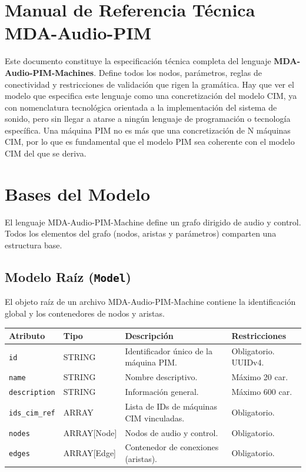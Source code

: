 \section{Manual de Referencia Técnica MDA-Audio-PIM}

Este documento constituye la especificación técnica completa del lenguaje \textbf{MDA-Audio-PIM-Machines}. Define todos los nodos, parámetros, reglas de conectividad y restricciones de validación que rigen la gramática. Hay que ver el modelo que especifica este lenguaje como una concretización del modelo CIM, ya con nomenclatura tecnológica orientada a la implementación del sistema de sonido, pero sin llegar a atarse a ningún lenguaje de programación o tecnología específica. Una máquina PIM no es más que una concretización de N máquinas CIM, por lo que es fundamental que el modelo PIM sea coherente con el modelo CIM del que se deriva.

\section{Bases del Modelo}

El lenguaje MDA-Audio-PIM-Machine define un grafo dirigido de audio y control. Todos los elementos del grafo (nodos, aristas y parámetros) comparten una estructura base.

\subsection{Modelo Raíz (\texttt{Model})}

El objeto raíz de un archivo MDA-Audio-PIM-Machine contiene la identificación global y los contenedores de nodos y aristas.

\begin{table}[H]
\centering
\small
\begin{tabular}{@{}llp{4cm}l@{}}
\toprule
Atributo & Tipo & Descripción & Restricciones \\ \midrule
\texttt{id} & STRING & Identificador único de la máquina PIM. & Obligatorio. UUIDv4. \\
\texttt{name} & STRING & Nombre descriptivo. & Máximo 20 car. \\
\texttt{description} & STRING & Información general. & Máximo 600 car. \\
\texttt{ids\_cim\_ref} & ARRAY & Lista de IDs de máquinas CIM vinculadas. & Obligatorio. \\
\texttt{nodes} & ARRAY[Node] & Nodos de audio y control. & Obligatorio. \\
\texttt{edges} & ARRAY[Edge] & Contenedor de conexiones (aristas). & Obligatorio. \\ \bottomrule
\end{tabular}
\end{table}

